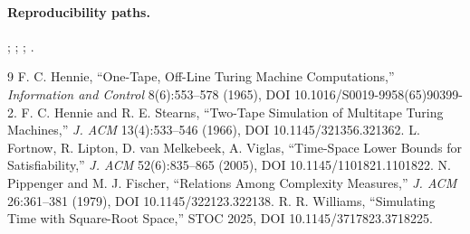 \documentclass[11pt]{article}
\begin{document}
\paragraph{Reproducibility paths.}
;
;
;
.
\begin{thebibliography}{9}
 F. C. Hennie, ``One-Tape, Off-Line Turing Machine Computations,'' \emph{Information and Control} 8(6):553--578 (1965), DOI 10.1016/S0019-9958(65)90399-2.
 F. C. Hennie and R. E. Stearns, ``Two-Tape Simulation of Multitape Turing Machines,'' \emph{J. ACM} 13(4):533--546 (1966), DOI 10.1145/321356.321362.
 L. Fortnow, R. Lipton, D. van Melkebeek, A. Viglas, ``Time-Space Lower Bounds for Satisfiability,'' \emph{J. ACM} 52(6):835--865 (2005), DOI 10.1145/1101821.1101822.
 N. Pippenger and M. J. Fischer, ``Relations Among Complexity Measures,'' \emph{J. ACM} 26:361--381 (1979), DOI 10.1145/322123.322138.
 R. R. Williams, ``Simulating Time with Square-Root Space,'' STOC 2025, DOI 10.1145/3717823.3718225.
\end{thebibliography}
\end{document}
